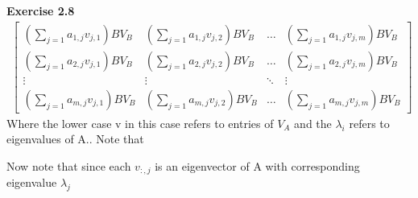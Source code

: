 \documentclass[12pt]{article}
\newenvironment{exercise}[1]{\vspace{.1in}\noindent\textbf{Exercise #1 \hspace{.05em}}}{}
\begin{document}
\begin{exercise}{2.8}
\begin{align}
\begin{bmatrix}
			 (\sum_{j=1}a_{1,j}v_{j,1})BV_B & (\sum_{j=1}a_{1,j}v_{j,2})BV_B & \dots  & (\sum_{j=1}a_{1,j}v_{j,m})BV_B \\
			 (\sum_{j=1}a_{2,j}v_{j,1})BV_B & (\sum_{j=1}a_{2,j}v_{j,2})BV_B & \dots  & (\sum_{j=1}a_{2,j}v_{j,m})BV_B \\
			 \vdots                         & \vdots                         & \ddots & \vdots                         \\
			 (\sum_{j=1}a_{m,j}v_{j,1})BV_B & (\sum_{j=1}a_{m,j}v_{j,2})BV_B & \dots  & (\sum_{j=1}a_{m,j}v_{j,m})BV_B\end{bmatrix}
	\end{align}
	Where the lower case v in this case refers to entries of $V_A$ and the $\lambda_i$ refers to eigenvalues of A.. Note that

	Now note that since each $v_{:,j}$ is an eigenvector of A with corresponding eigenvalue $\lambda_j$


\end{exercise}
\end{document}
